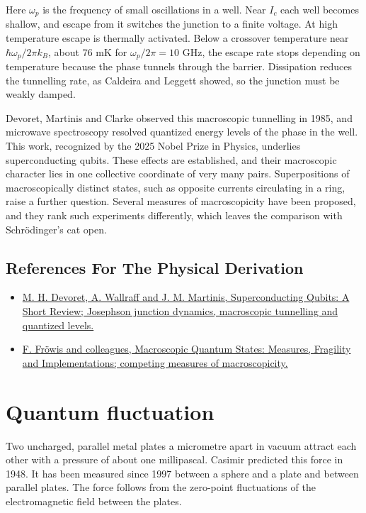 \documentclass[11pt,oneside]{book}
\begin{document}
Here \(\omega_p\) is the frequency of small oscillations in a well. Near \(I_c\) each well becomes shallow, and escape from it switches the junction to a finite voltage. At high temperature escape is thermally activated. Below a crossover temperature near \(\hbar\omega_p/2\pi k_B\), about 76 mK for \(\omega_p/2\pi=10\) GHz, the escape rate stops depending on temperature because the phase tunnels through the barrier. Dissipation reduces the tunnelling rate, as Caldeira and Leggett showed, so the junction must be weakly damped.

Devoret, Martinis and Clarke observed this macroscopic tunnelling in 1985, and microwave spectroscopy resolved quantized energy levels of the phase in the well. This work, recognized by the 2025 Nobel Prize in Physics, underlies superconducting qubits. These effects are established, and their macroscopic character lies in one collective coordinate of very many pairs. Superpositions of macroscopically distinct states, such as opposite currents circulating in a ring, raise a further question. Several measures of macroscopicity have been proposed, and they rank such experiments differently, which leaves the comparison with Schrödinger's cat open.

\subsection*{References For The Physical Derivation}
\begin{itemize}
\item \href{https://arxiv.org/abs/cond-mat/0411174}{M. H. Devoret, A. Wallraff and J. M. Martinis, Superconducting Qubits: A Short Review; Josephson junction dynamics, macroscopic tunnelling and quantized levels.}
\item \href{https://arxiv.org/abs/1706.06173}{F. Fröwis and colleagues, Macroscopic Quantum States: Measures, Fragility and Implementations; competing measures of macroscopicity.}
\end{itemize}





\clearpage

\section{Quantum fluctuation}

\label{topic:quantum-fluctuation}

Two uncharged, parallel metal plates a micrometre apart in vacuum attract each other with a pressure of about one millipascal. Casimir predicted this force in 1948. It has been measured since 1997 between a sphere and a plate and between parallel plates. The force follows from the zero-point fluctuations of the electromagnetic field between the plates.
\end{document}
